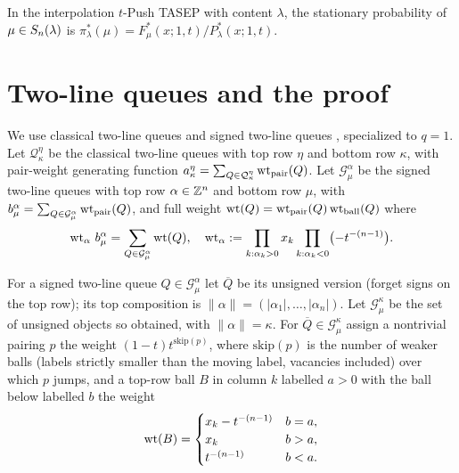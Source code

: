 \begin{qthreetheorem}\label{thm:main}
In the interpolation $t$-Push TASEP with content $\lambda$, the stationary
probability of $\mu\in S_n(\lambda)$ is $\pi^*_\lambda(\mu)=F^*_\mu(x;1,t)/P^*_\lambda(x;1,t)$.
\end{qthreetheorem}

\section*{Two-line queues and the proof}

We use classical two-line queues \cite{CMW22} and signed two-line queues
\cite{BDW25a}, specialized to $q=1$. Let $\mathcal Q^\eta_\kappa$ be the classical
two-line queues with top row $\eta$ and bottom row $\kappa$, with pair-weight
generating function $a^\eta_\kappa=\sum_{Q\in\mathcal Q^\eta_\kappa}\operatorname{wt}_{\mathrm{pair}}(Q)$.
Let $\mathcal G^\alpha_\mu$ be the signed two-line queues with top row $\alpha\in\mathbb{Z}^n$
and bottom row $\mu$, with $b^\alpha_\mu=\sum_{Q\in\mathcal G^\alpha_\mu}\operatorname{wt}_{\mathrm{pair}}(Q)$,
and full weight $\operatorname{wt}(Q)=\operatorname{wt}_{\mathrm{pair}}(Q)\operatorname{wt}_{\mathrm{ball}}(Q)$ where
\begin{equation}\label{eq:wta}
\operatorname{wt}_\alpha\,b^\alpha_\mu=\sum_{Q\in\mathcal G^\alpha_\mu}\operatorname{wt}(Q),
\quad \operatorname{wt}_\alpha:=\prod_{k:\alpha_k>0}x_k\prod_{k:\alpha_k<0}\bigl(-t^{-(n-1)}\bigr).
\end{equation}

\begin{qthreedefinition}\label{def:unsigned}
For a signed two-line queue $Q\in\mathcal G^\alpha_\mu$ let $\overline Q$ be its
unsigned version (forget signs on the top row); its top composition is
$\|\alpha\|=(|\alpha_1|,\dots,|\alpha_n|)$. Let $\mathcal G^\kappa_\mu$ be the set of
unsigned objects so obtained, with $\|\alpha\|=\kappa$. For $\overline Q\in\mathcal G^\kappa_\mu$
assign a nontrivial pairing $p$ the weight $(1-t)t^{\mathrm{skip}(p)}$, where
$\mathrm{skip}(p)$ is the number of weaker balls (labels strictly smaller than the
moving label, vacancies included) over which $p$ jumps, and a top-row
ball $B$ in column $k$ labelled $a>0$ with the ball below labelled $b$ the weight
\[
\operatorname{wt}(B)=\begin{cases}x_k-t^{-(n-1)} & b=a,\\ x_k & b>a,\\ t^{-(n-1)} & b<a.\end{cases}
\]
\end{qthreedefinition}

